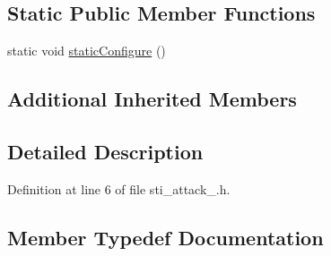 \subsection*{Static Public Member Functions}
\begin{DoxyCompactItemize}
\item 
static void \hyperlink{structsm__starcraft__ai_1_1attack__inner__states_1_1StiAttack3_a95e932b70e9a8de911ab0d6f74b567a5}{static\+Configure} ()
\end{DoxyCompactItemize}
\subsection*{Additional Inherited Members}


\subsection{Detailed Description}


Definition at line 6 of file sti\+\_\+attack\+\_.\+h.



\subsection{Member Typedef Documentation}
\mbox{\label{structsm__starcraft__ai_1_1attack__inner__states_1_1StiAttack3_acebef7eb53f0bacb5a6be79fdd61c831}} 
